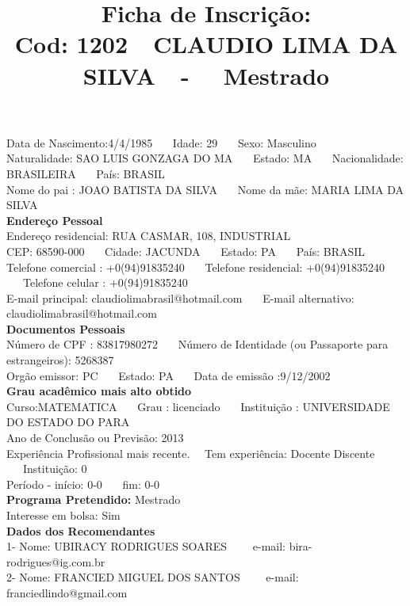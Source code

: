 \documentclass[11pt]{article}
\title{\vspace*{-4cm} Ficha de Inscrição: \\Cod: 1202\ \ CLAUDIO LIMA DA SILVA\ \ - \ \ Mestrado 
 }
\date{}
\begin{document}
\maketitle
\vspace*{-1.5cm}
\noindent Data de Nascimento:4/4/1985
\ \ \ Idade: 29   \ \ \ Sexo: Masculino
\\
Naturalidade: SAO LUIS  GONZAGA DO MA  
\ \ \  Estado: MA
\ \ \  Nacionalidade: BRASILEIRA
\ \ \ País: BRASIL
\\        
Nome do pai : JOAO BATISTA DA SILVA
\ \ \ Nome da mãe: MARIA LIMA DA SILVA          
\\[0.2cm]                     
\textbf{Endereço Pessoal} 
\\ 
\noindent Endereço residencial: RUA CASMAR, 108, INDUSTRIAL
\\
        CEP: 68590-000 
\ \ \ Cidade: JACUNDA 
\ \ \ Estado: PA 
\ \ \ País: BRASIL
\\		
		Telefone comercial : +0(94)91835240
\ \ \ Telefone residencial: +0(94)91835240
\ \ \ Telefone celular : +0(94)91835240
\\
E-mail principal: claudiolimabrasil@hotmail.com
\ \ \ E-mail alternativo: claudiolimabrasil@hotmail.com 
\\[0.2cm] 
\textbf{Documentos Pessoais}
\\
\noindent Número de CPF : 83817980272
\ \ \ Número de Identidade (ou Passaporte para estrangeiros): 5268387
\\
Orgão emissor: PC
\ \ \ Estado: PA
\ \ \ Data de emissão :9/12/2002
\\[0.3cm]
\textbf{Grau acadêmico mais alto obtido}
\\	
Curso:MATEMATICA
\ \ \ Grau : licenciado
\ \ \ Instituição : UNIVERSIDADE DO ESTADO DO PARA
\\			
Ano de Conclusão ou Previsão: 2013
\\ 
Experiência Profissional mais recente. \ \  
Tem experiência: Docente Discente  
\ \ \ Instituição: 0
\\  
Período - início: 0-0
\ \ \ fim: 0-0
\\[0.2cm] 
\textbf{Programa Pretendido:} Mestrado\\
Interesse em bolsa: Sim
\\[0.3cm]		
\textbf{Dados dos Recomendantes} 
\\
1- Nome: UBIRACY RODRIGUES SOARES
\ \ \ \  e-mail: bira-rodrigues@ig.com.br 
\\
2- Nome: FRANCIED MIGUEL DOS SANTOS
\ \ \ \ e-mail: franciedlindo@gmail.com
\\
\end{document}
